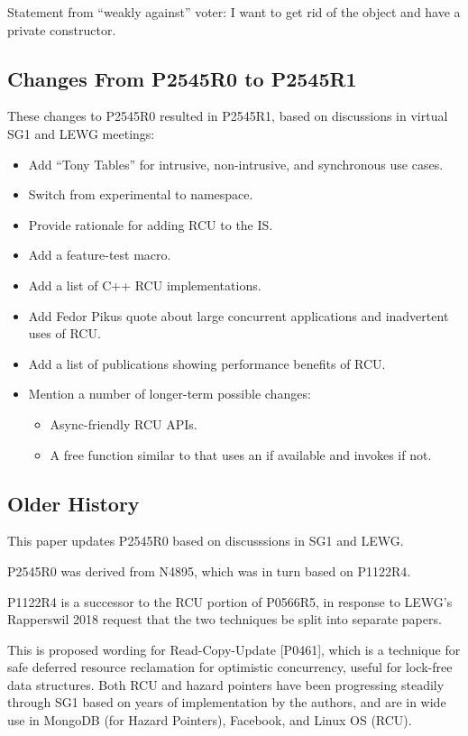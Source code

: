 Statement from ``weakly against'' voter: I want to get rid of the object
and have a private constructor.

\subsection{Changes From P2545R0 to P2545R1}
\label{sec:Changes From P2545R0 to P2545R1}

These changes to P2545R0 resulted in P2545R1, based on discussions
in virtual SG1 and LEWG meetings:

\begin{itemize}
\item	Add ``Tony Tables'' for intrusive, non-intrusive, and
	synchronous use cases.
\item	Switch from experimental to  namespace.
\item	Provide rationale for adding RCU to the IS.
\item	Add a feature-test macro.
\item	Add a list of C++ RCU implementations.
\item	Add Fedor Pikus quote about large concurrent applications
	and inadvertent uses of RCU.
\item	Add a list of publications showing performance benefits of RCU.
\item	Mention a number of longer-term possible changes:
	\begin{itemize}
	\item	Async-friendly RCU APIs.
	\item	A free function similar to  that
		uses an  if available and invokes
		 if not.
	\end{itemize}
\end{itemize}

\subsection{Older History}
\label{sec:Older History}

This paper updates P2545R0 based on discusssions in SG1 and LEWG.

P2545R0 was derived from N4895, which was in turn based on P1122R4.

P1122R4 is a successor to the RCU portion of P0566R5, in response to
LEWG’s Rapperswil 2018 request that the two techniques be split into
separate papers.

This is proposed wording for Read-Copy-Update [P0461], which is
a technique for safe deferred resource reclamation for optimistic
concurrency, useful for lock-free data structures.
Both RCU and hazard pointers have been progressing steadily through SG1
based on years of implementation by the authors, and are in wide use in
MongoDB (for Hazard Pointers), Facebook, and Linux OS (RCU).

